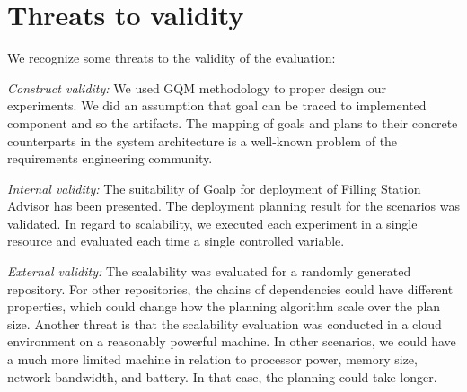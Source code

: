 \section{Threats to validity}

We recognize some threats to the validity of the evaluation:

\emph{Construct validity:}
We used GQM methodology to proper design our experiments. We did an assumption that goal can be traced to implemented component and so the artifacts. The mapping of goals and plans to their concrete counterparts in the system architecture is a well-known problem of the requirements engineering community.

\emph{Internal validity:}
The suitability of Goalp for deployment of Filling Station Advisor has been presented. The deployment planning result for the scenarios was validated.
In regard to scalability, we executed each experiment in a single resource and evaluated each time a single controlled variable.

\emph{External validity:}
The scalability was evaluated for a randomly generated repository. For other repositories, the chains of dependencies could have different properties, which could change how the planning algorithm scale over the plan size.
Another threat is that the scalability evaluation was conducted in a cloud environment on a reasonably powerful machine. In other scenarios, we could have a much more limited machine in relation to processor power, memory size, network bandwidth, and battery. In that case, the planning could take longer.
